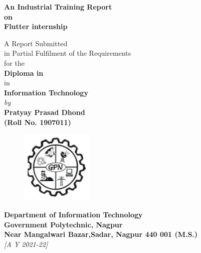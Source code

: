 \begin{titlepage}
\enlargethispage{3cm}

\begin{center}

\vspace*{-1cm}

\textbf{\Large An Industrial Training Report\\on\\ Flutter internship }\\[10pt]

\vspace*{0.5cm}


                         A Report Submitted \\
                     in Partial Fulfilment of the Requirements  \\
                     for the   \\
                          \vspace{5mm}
                   {\Large \bf Diploma in  } \\
                   in \\
                   {\large \bf Information Technology } \\

                      \vspace{10mm}
                   {\em  by} \\ \vspace{3mm}
             {\large \bf Pratyay Prasad Dhond} \\
{\large \bf (Roll No. 1907011)}\\[.3in]

\vfill

\begin{figure}[h]
  \begin{center}
  \includegraphics[height=35mm]{Images & Logos/gpn_logo.png}
  \end{center}
\end{figure}
\vspace*{0.1cm}

{\bf\large Department of Information Technology} \\%
{\bf\large Government Polytechnic, Nagpur}\\%
{\bf\large Near Mangalwari Bazar,Sadar, Nagpur 440 001 (M.S.) }\\%
{\it\large [A Y 2021-22]}

\end{center}

\end{titlepage}

\clearpage

